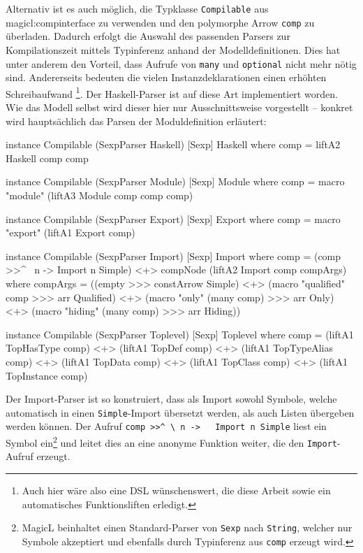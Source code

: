 \documentclass[12pt, a4paper, bibgerm]{scrbook}
\newenvironment{DIFnomarkup}{}{}
\newcommand\icode[1]{\lstinline?#1?}
\newcommand\sref{}
\begin{document}
Alternativ ist es auch möglich, die Typklasse \icode{Compilable} aus
\sref{magicl:compinterface} zu verwenden und den polymorphe
Arrow \icode{comp} zu überladen. Dadurch erfolgt die Auswahl des
passenden Parsers zur Kompilationszeit mittels Typinferenz anhand der
Modelldefinitionen. Dies hat unter anderem den Vorteil, dass Aufrufe von
\icode{many} und \icode{optional} nicht mehr nötig sind. Andererseits
bedeuten die vielen Instanzdeklarationen einen erhöhten Schreibaufwand
\footnote{Auch hier wäre also eine DSL wünschenswert, die diese Arbeit
  sowie ein automatisches Funktionsliften erledigt.}. Der Haskell-Parser
ist auf diese Art implementiert worden. Wie das Modell selbst wird
dieser hier nur Ausschnittsweise vorgestellt -- konkret wird
hauptsächlich das Parsen der Moduldefinition erläutert:
\begin{DIFnomarkup}\begin{code}
instance Compilable (SexpParser Haskell) [Sexp] Haskell where
    comp = liftA2 Haskell comp comp

instance Compilable (SexpParser Module) [Sexp] Module where
    comp = macro "module" (liftA3 Module comp comp comp)

instance Compilable (SexpParser Export) [Sexp] Export where
    comp = macro "export" (liftA1 Export comp)

instance Compilable (SexpParser Import) [Sexp] Import where
    comp  = (comp >>^ \ n -> Import n Simple) <+>
             compNode (liftA2 Import comp compArgs)
        where compArgs =
                  ((empty >>> constArrow Simple)               <+>
                   (macro "qualified" comp >>> arr Qualified)  <+>
                   (macro "only" (many comp) >>> arr Only)     <+>
                   (macro "hiding" (many comp) >>> arr Hiding))

instance Compilable (SexpParser Toplevel) [Sexp] Toplevel where
    comp = (liftA1 TopHasType comp)   <+>
           (liftA1 TopDef comp)       <+>
           (liftA1 TopTypeAlias comp) <+>
           (liftA1 TopData comp)      <+>
           (liftA1 TopClass comp)     <+>
           (liftA1 TopInstance comp)
\end{code}\end{DIFnomarkup}
Der Import-Parser ist so konstruiert, dass als Import sowohl Symbole,
welche automatisch in einen \icode{Simple}-Import übersetzt werden, als
auch Listen übergeben werden können. Der Aufruf \icode{comp >>^ \ n ->
  Import n Simple} liest ein Symbol ein\footnote{MagicL beinhaltet einen
Standard-Parser von \icode{Sexp} nach \icode{String}, welcher nur
Symbole akzeptiert und ebenfalls durch Typinferenz aus \icode{comp}
erzeugt wird.} und leitet dies an eine anonyme Funktion weiter, die den
\icode{Import}-Aufruf erzeugt.
\end{document}
